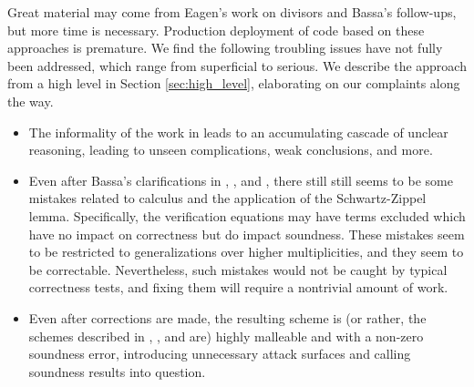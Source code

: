 \documentclass{article}
\theoremstyle{definition}
\newcommand{\6}{\mathbf}
\newcommand{\7}{\mathcal}
\begin{document}
Great material may come from Eagen's work on divisors and Bassa's follow-ups, but more time is necessary. Production deployment of code based on these approaches is premature.
We find the following troubling issues have not fully been addressed, which range from superficial to serious. We describe the approach from a high level in Section \ref{sec:high_level}, elaborating on our complaints along the way. 

\begin{itemize}
\item The informality of the work in \cite{Eagen22} leads to an accumulating cascade of unclear reasoning, leading to unseen complications, weak conclusions, and more. %

\item Even after Bassa's clarifications in \cite{BassaSoundnessProofSoP}, \cite{BassaLogDerivSoP}, and \cite{BassaSoundnessIPDL}, there still still seems to be some mistakes related to calculus and the application of the Schwartz-Zippel lemma. Specifically, the verification equations may have terms excluded which have no impact on correctness but do impact soundness. These mistakes seem to be restricted to generalizations over higher multiplicities, and  they seem to be correctable. Nevertheless, such mistakes would not be caught by typical correctness tests, and fixing them will require a nontrivial amount of work.

\item Even after corrections are made, the resulting scheme is (or rather, the schemes described in \cite{BassaSoundnessProofSoP}, \cite{EagenSage24}, and \cite{Kayaba24} are) highly malleable and with a non-zero soundness error, introducing unnecessary attack surfaces and calling soundness results into question.


\end{itemize}
\end{document}
